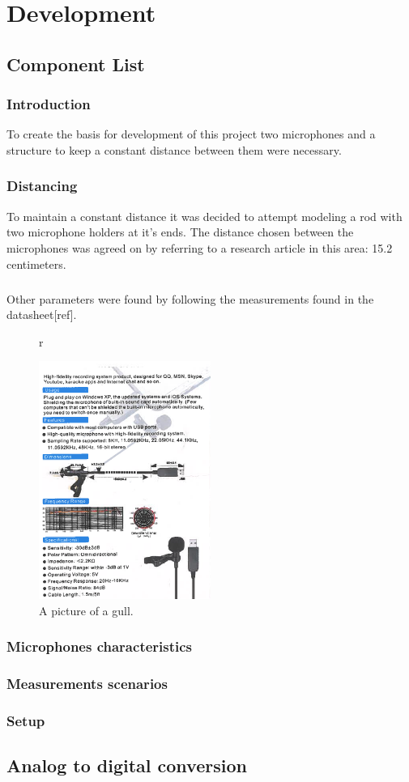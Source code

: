 \chapter{Development}\label{Development}
\section{Component List}
\subsection{Introduction}
To create the basis for development of this project two microphones and a structure to keep a constant distance between them were necessary.  
\subsection{Distancing}
To maintain a constant distance it was decided to attempt modeling a rod with two microphone holders at it's ends. The distance chosen between the microphones was agreed on by referring to a research article in this area: 15.2 centimeters. 
\paragraph{}
Other parameters were found by following the measurements found in the datasheet[ref].
\begin{figure}[ref] {r}
  \caption{A picture of a gull.}
  \centering
    \includegraphics[width=0.5\textwidth]{Illustrations/MicData}
\end{figure}

\subsection{Microphones characteristics}
\subsection{Measurements scenarios}
\subsection{Setup}
\section{Analog to digital conversion}



